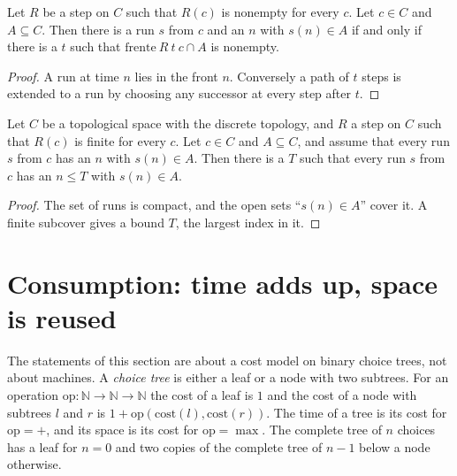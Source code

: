 \begin{theorem}
  \label{thm:dynamics-angelic}
  \leanok
  Let $R$ be a step on $C$ such that $R(c)$ is nonempty for every $c$. Let $c \in C$ and
  $A \subseteq C$. Then there is a run $s$ from $c$ and an $n$ with $s(n) \in A$ if and only if
  there is a $t$ such that $\mathrm{frente}\ R\ t\ c \cap A$ is nonempty.
  \own{}
\end{theorem}

\begin{proof}
  \leanok
  A run at time $n$ lies in the front $n$. Conversely a path of $t$ steps is extended to a run by
  choosing any successor at every step after $t$.
\end{proof}

\begin{theorem}
  \label{thm:dynamics-demonic}
  \leanok
  Let $C$ be a topological space with the discrete topology, and $R$ a step on $C$ such that
  $R(c)$ is finite for every $c$. Let $c \in C$ and $A \subseteq C$, and assume that every run $s$
  from $c$ has an $n$ with $s(n) \in A$. Then there is a $T$ such that every run $s$ from $c$ has an
  $n \le T$ with $s(n) \in A$.
  \own{}
\end{theorem}

\begin{proof}
  \leanok
  The set of runs is compact, and the open sets ``$s(n) \in A$'' cover it. A finite subcover gives
  a bound $T$, the largest index in it.
\end{proof}

\section{Consumption: time adds up, space is reused}
\label{sec:dynamics-consumption}

The statements of this section are about a cost model on binary choice trees, not about machines.
A \emph{choice tree} is either a leaf or a node with two subtrees. For an operation
$\mathrm{op} : \mathbb{N} \to \mathbb{N} \to \mathbb{N}$ the cost of a leaf is $1$ and the cost of a
node with subtrees $l$ and $r$ is $1 + \mathrm{op}(\mathrm{cost}(l), \mathrm{cost}(r))$. The time of
a tree is its cost for $\mathrm{op} = +$, and its space is its cost for $\mathrm{op} = \max$. The
complete tree of $n$ choices has a leaf for $n = 0$ and two copies of the complete tree of $n - 1$
below a node otherwise.

